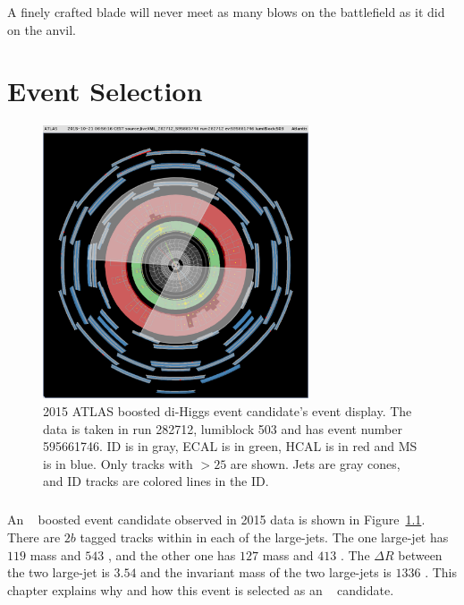 \begin{savequote}[75mm]
A finely crafted blade will never meet as many blows on the battlefield as it did on the anvil.
\end{savequote}

\chapter{Event Selection}
\label{sec:selection}

\begin{figure}[htb!]
  \centering
  \includegraphics[width=0.7\textwidth]{figures/theory/JiveXML_282712_595661746-YX-2018-04-16-20-50-34}
  \caption{2015 ATLAS boosted di-Higgs event candidate's event display. The data is taken in run 282712, lumiblock 503 and has event number 595661746. ID is in gray, ECAL is in green, HCAL is in red and MS is in blue. Only tracks with \pt $>25$ \GeV are shown. Jets are gray cones, and ID tracks are colored lines in the ID.}
  \label{fig:event_display}
\end{figure}

\paragraph{}
An \Xtohhb~ boosted event candidate observed in 2015 data is shown in Figure~\ref{fig:event_display}. 
There are $2b$ tagged tracks within in each of the large-\R jets. 
The one large-\R jet has $119$ \GeV mass and $543$ \GeV \pt, and the other one has $127$ \GeV mass and $413$ \GeV \pt. 
The $\Delta R$ between the two large-\R jet is $3.54$ and the invariant mass of the two large-\R jets is $1336$ \GeV.
This chapter explains why and how this event is selected as an \Xtohhb~ candidate.

